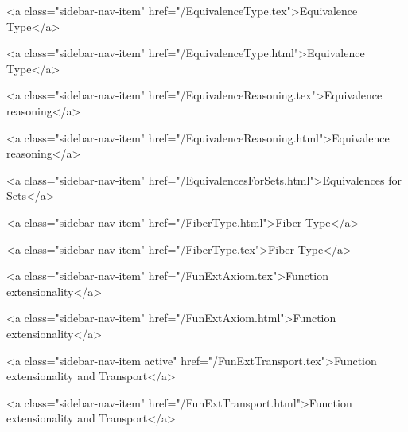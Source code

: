       
        
          <a class="sidebar-nav-item" href="/EquivalenceType.tex">Equivalence Type</a>
        
      
    
      
        
          <a class="sidebar-nav-item" href="/EquivalenceType.html">Equivalence Type</a>
        
      
    
      
        
          <a class="sidebar-nav-item" href="/EquivalenceReasoning.tex">Equivalence reasoning</a>
        
      
    
      
        
          <a class="sidebar-nav-item" href="/EquivalenceReasoning.html">Equivalence reasoning</a>
        
      
    
      
        
          <a class="sidebar-nav-item" href="/EquivalencesForSets.html">Equivalences for Sets</a>
        
      
    
      
        
          <a class="sidebar-nav-item" href="/FiberType.html">Fiber Type</a>
        
      
    
      
        
          <a class="sidebar-nav-item" href="/FiberType.tex">Fiber Type</a>
        
      
    
      
        
          <a class="sidebar-nav-item" href="/FunExtAxiom.tex">Function extensionality</a>
        
      
    
      
        
          <a class="sidebar-nav-item" href="/FunExtAxiom.html">Function extensionality</a>
        
      
    
      
        
          <a class="sidebar-nav-item active" href="/FunExtTransport.tex">Function extensionality and Transport</a>
        
      
    
      
        
          <a class="sidebar-nav-item" href="/FunExtTransport.html">Function extensionality and Transport</a>
        

